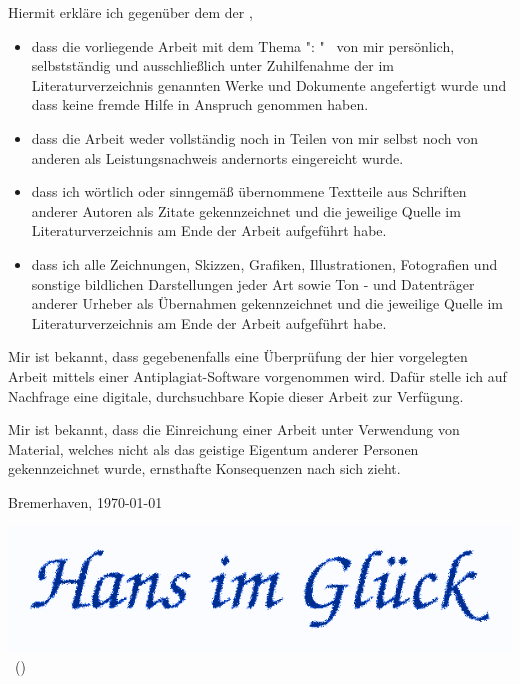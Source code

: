 \thispagestyle{empty}

Hiermit erkläre ich gegenüber dem \sDepartment der \sUni,

\begin{itemize}
	\item dass die vorliegende Arbeit mit dem Thema "\sTitle : \sCaption" \ von mir
	persönlich, selbstständig und ausschließlich unter Zuhilfenahme der im Literaturverzeichnis genannten Werke und
	Dokumente angefertigt wurde und dass keine fremde Hilfe in Anspruch genommen haben.
	\item dass die Arbeit weder vollständig noch in Teilen von mir selbst noch von anderen als Leistungsnachweis andernorts eingereicht wurde.
	\item dass ich wörtlich oder sinngemäß übernommene Textteile aus Schriften anderer Autoren als Zitate
	gekennzeichnet und die jeweilige Quelle im Literaturverzeichnis am Ende der Arbeit aufgeführt habe.
	\item dass ich alle Zeichnungen, Skizzen, Grafiken, Illustrationen, Fotografien und sonstige bildlichen	Darstellungen jeder Art sowie Ton - und Datenträger anderer Urheber als Übernahmen gekennzeichnet und die jeweilige Quelle im Literaturverzeichnis am Ende der Arbeit aufgeführt habe.
\end{itemize}

Mir ist bekannt, dass gegebenenfalls eine Überprüfung der hier vorgelegten Arbeit mittels einer
Antiplagiat-Software vorgenommen wird. Dafür stelle ich auf Nachfrage eine digitale, durchsuchbare Kopie dieser Arbeit zur Verfügung.

Mir ist bekannt, dass die Einreichung einer Arbeit unter Verwendung von Material, welches nicht als das geistige Eigentum anderer Personen gekennzeichnet wurde, ernsthafte Konsequenzen nach sich zieht.

\vspace {0.5cm}

Bremerhaven, \today \qquad

\begin{minipage}[hbt]{3in}
\vspace {0.5cm}
	\includegraphics[scale=0.15]{images/signatur.png} \\
	\sName \ (\sMtrNr)
\end{minipage}